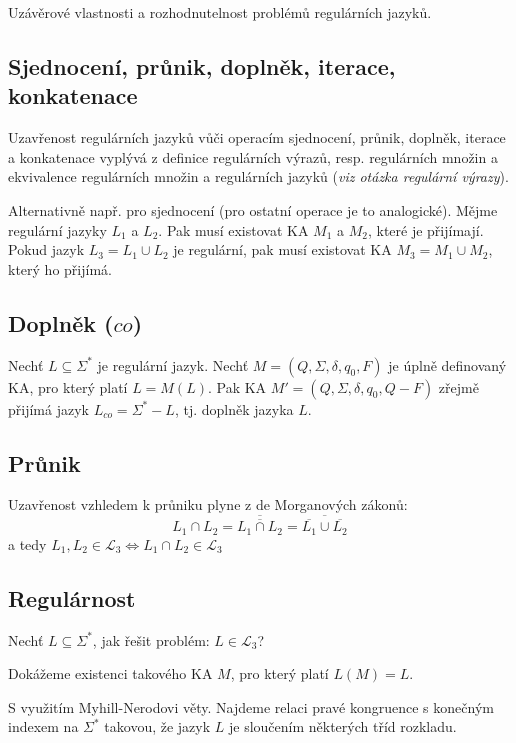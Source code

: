 Uzávěrové vlastnosti a rozhodnutelnost problémů regulárních jazyků.

\subsection{Sjednocení, průnik, doplněk, iterace, konkatenace}

\begin{compactitem}
    \item Uzavřenost regulárních jazyků vůči operacím sjednocení, průnik, doplněk, iterace a konkatenace vyplývá z definice regulárních výrazů, resp. regulárních množin a ekvivalence regulárních množin a regulárních jazyků (\textit{viz otázka regulární výrazy}). \begin{compactitem}
        \item Alternativně např. pro sjednocení (pro ostatní operace je to analogické). Mějme regulární jazyky $L_1$ a $L_2$. Pak musí existovat KA $M_1$ a $M_2$, které je přijímají. Pokud jazyk $L_3 = L_1 \cup L_2$ je regulární, pak musí existovat KA $M_3 = M_1 \cup M_2$, který ho přijímá. %
    \end{compactitem}
\end{compactitem}

\subsection{Doplněk ($co$)}

Nechť $L \subseteq \Sigma^*$ je regulární jazyk. Nechť $M = (Q, \Sigma, \delta, q_0, F)$ je úplně definovaný KA, pro který platí $L = M(L)$. Pak KA $M' = (Q, \Sigma, \delta, q_0, Q - F)$ zřejmě přijímá jazyk $L_{co} = \Sigma^* - L$, tj. doplněk jazyka $L$.

\subsection{Průnik}

Uzavřenost vzhledem k průniku plyne z de Morganových zákonů: $$L_1 \cap L_2 = \overline{\overline{L_1 \cap L_2}} = \overline{\overline{L_1} \cup \overline{L_2}}$$ a tedy $L_1, L_2 \in \mathcal{L}_3 \Leftrightarrow L_1 \cap L_2 \in \mathcal{L}_3$

\subsection{Regulárnost}

\begin{compactitem}
    \item Nechť $L \subseteq \Sigma^*$, jak řešit problém: $L \in \mathcal{L}_3$? \begin{compactitem}

        \item Dokážeme existenci takového KA $M$, pro který platí $L(M) = L$.

        \item S využitím Myhill-Nerodovi věty. Najdeme relaci pravé kongruence s konečným indexem na $\Sigma^*$ takovou, že jazyk $L$ je sloučením některých tříd rozkladu.
    \end{compactitem}
\end{compactitem}


